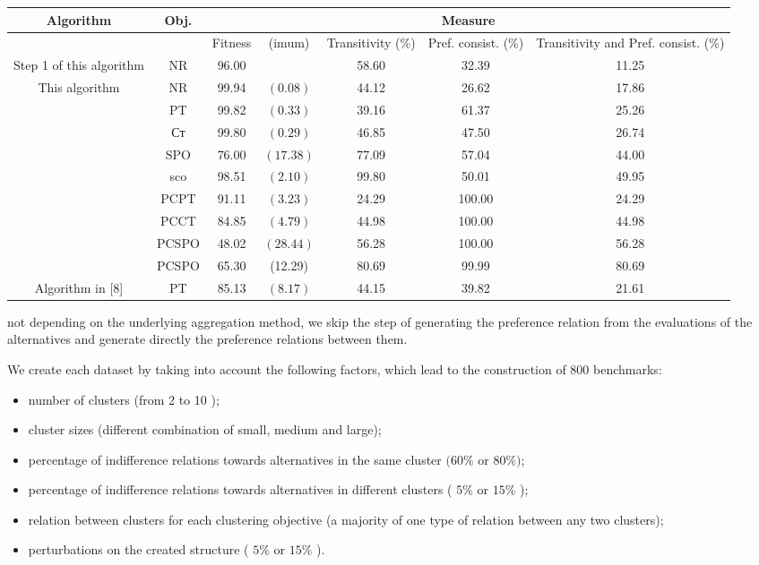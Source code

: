 \documentclass[10pt]{article}
\begin{document}
\begin{center}
\begin{tabular}{|c|c|c|c|c|c|c|}
\hline
\multirow[t]{2}{*}{Algorithm} & \multirow[t]{2}{*}{Obj.} & \multicolumn{5}{|c|}{Measure} \\
\hline
 &  & Fitness & (imum) & Transitivity (\%) & Pref. consist. (\%) & Transitivity and Pref. consist. (\%) \\
\hline
Step 1 of this algorithm & $\mathrm{NR}$ & 96.00 &  & 58.60 & 32.39 & 11.25 \\
\hline
\multirow[t]{9}{*}{This algorithm} & $\mathrm{NR}$ & 99.94 & $(0.08)$ & 44.12 & 26.62 & 17.86 \\
\hline
 & PT & 99.82 & $(0.33)$ & 39.16 & 61.37 & 25.26 \\
\hline
 & Ст & 99.80 & $(0.29)$ & 46.85 & 47.50 & 26.74 \\
\hline
 & SPO & 76.00 & $(17.38)$ & 77.09 & 57.04 & 44.00 \\
\hline
 & sco & 98.51 & $(2.10)$ & 99.80 & 50.01 & 49.95 \\
\hline
 & PCPT & 91.11 & $(3.23)$ & 24.29 & 100.00 & 24.29 \\
\hline
 & PCCT & 84.85 & $(4.79)$ & 44.98 & 100.00 & 44.98 \\
\hline
 & PCSPO & 48.02 & $(28.44)$ & 56.28 & 100.00 & 56.28 \\
\hline
 & PCSPO & 65.30 & (12.29) & 80.69 & 99.99 & 80.69 \\
\hline
Algorithm in [8] & PT & 85.13 & $(8.17)$ & 44.15 & 39.82 & 21.61 \\
\hline
\end{tabular}
\end{center}

not depending on the underlying aggregation method, we skip the step of generating the preference relation from the evaluations of the alternatives and generate directly the preference relations between them.

We create each dataset by taking into account the following factors, which lead to the construction of 800 benchmarks:

\begin{itemize}
  \item number of clusters (from 2 to 10 );
  \item cluster sizes (different combination of small, medium and large);
  \item percentage of indifference relations towards alternatives in the same cluster $(60 \%$ or $80 \%)$;
  \item percentage of indifference relations towards alternatives in different clusters ( $5 \%$ or $15 \%$ );
  \item relation between clusters for each clustering objective (a majority of one type of relation between any two clusters);
  \item perturbations on the created structure ( $5 \%$ or $15 \%$ ).
\end{itemize}
\end{document}
